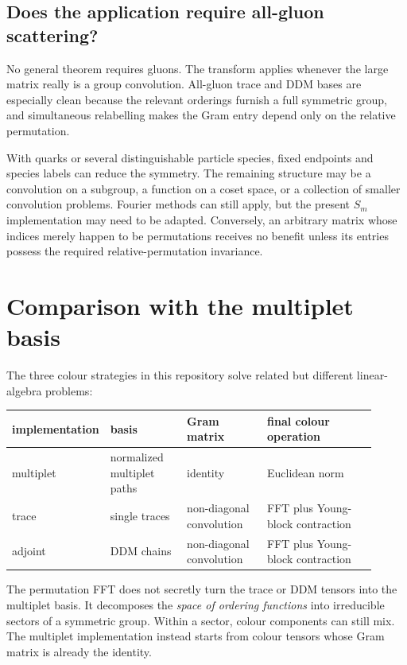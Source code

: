 \documentclass[11pt,a4paper]{article}
\begin{document}
\subsection{Does the application require all-gluon scattering?}

No general theorem requires gluons.  The transform applies whenever the
large matrix really is a group convolution.  All-gluon trace and DDM bases
are especially clean because the relevant orderings furnish a full symmetric
group, and simultaneous relabelling makes the Gram entry depend only on the
relative permutation.

With quarks or several distinguishable particle species, fixed endpoints and
species labels can reduce the symmetry.  The remaining structure may be a
convolution on a subgroup, a function on a coset space, or a collection of
smaller convolution problems.  Fourier methods can still apply, but the
present $S_m$ implementation may need to be adapted.  Conversely, an
arbitrary matrix whose indices merely happen to be permutations receives no
benefit unless its entries possess the required relative-permutation
invariance.

\section{Comparison with the multiplet basis}

The three colour strategies in this repository solve related but different
linear-algebra problems:
\begin{center}
\small
\begin{tabular}{@{}
  >{\raggedright\arraybackslash}p{0.18\linewidth}
  >{\raggedright\arraybackslash}p{0.21\linewidth}
  >{\raggedright\arraybackslash}p{0.22\linewidth}
  >{\raggedright\arraybackslash}p{0.30\linewidth}@{}}
  \toprule
  implementation & basis & Gram matrix & final colour operation \\
  \midrule
  multiplet & normalized multiplet paths & identity & Euclidean norm \\
  trace & single traces & non-diagonal convolution & FFT plus Young-block contraction \\
  adjoint & DDM chains & non-diagonal convolution & FFT plus Young-block contraction \\
  \bottomrule
\end{tabular}
\end{center}

The permutation FFT does not secretly turn the trace or DDM tensors into the
multiplet basis.  It decomposes the \emph{space of ordering functions} into
irreducible sectors of a symmetric group.  Within a sector, colour components
can still mix.  The multiplet implementation instead starts from colour
tensors whose Gram matrix is already the identity.
\end{document}
